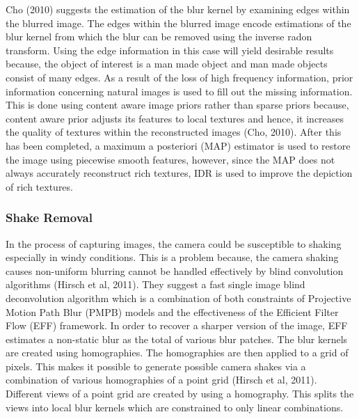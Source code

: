\documentclass[a4paper, 12pt]{article}
\begin{document}
Cho (2010) suggests the estimation of the blur kernel by examining edges within the blurred image. The edges within the blurred image encode estimations of the blur kernel from which the blur can be removed using the inverse radon transform. Using the edge information in this case will yield desirable results because, the object of interest is a man made object and man made objects consist of many edges. As a result of the loss of high frequency information, prior information concerning natural images is used to fill out the missing information. This is done using content aware image priors rather than sparse priors because, content aware prior adjusts its features to local textures and hence, it increases the quality of textures within the reconstructed images (Cho, 2010). After this has been completed, a maximum a posteriori (MAP) estimator is used to restore the image using piecewise smooth features, however, since the MAP does not always accurately reconstruct rich textures, IDR is used to improve the depiction of rich textures. 

\subsubsection{Shake Removal}
In the process of capturing images, the camera could be susceptible to shaking especially in windy conditions. This is a problem because, the camera shaking causes non-uniform blurring cannot be handled effectively by blind convolution algorithms (Hirsch et al, 2011). They suggest a fast single image  blind deconvolution algorithm which is a combination of both constraints of Projective Motion Path Blur (PMPB) models and the effectiveness of the Efficient Filter Flow (EFF) framework. In order to recover a sharper version of the image, EFF estimates a non-static blur as the total of various blur patches. The blur kernels are created using homographies. The homographies are then applied to a grid of pixels. This makes it possible to generate possible camera shakes via a combination of various homographies of a point grid (Hirsch et al, 2011). Different views of a point grid are created by using a homography. This splits the views into local blur kernels which are constrained to only linear combinations. 
\end{document}
